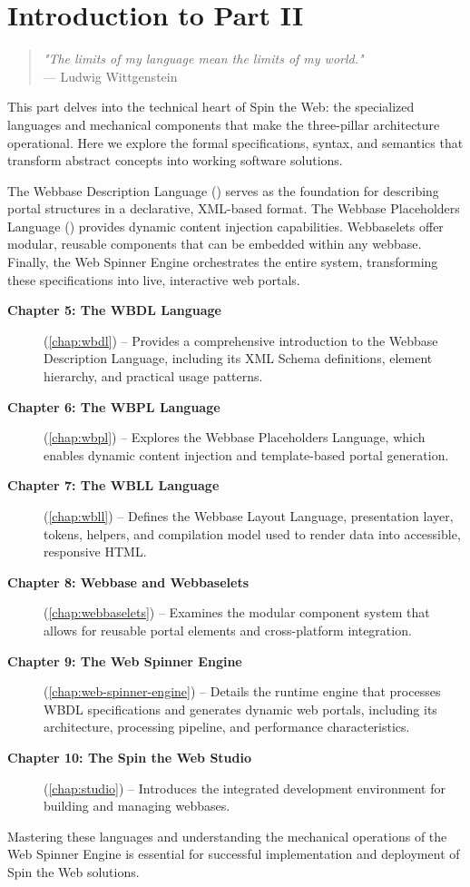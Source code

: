 
\chapter*{Introduction to Part II}
\label{part:languages}

\begin{quote}
\textit{"The limits of my language mean the limits of my world."} \\
— Ludwig Wittgenstein
\end{quote}

This part delves into the technical heart of Spin the Web: the specialized languages and mechanical components that make the three-pillar architecture operational. Here we explore the formal specifications, syntax, and semantics that transform abstract concepts into working software solutions.

The Webbase Description Language (\wbdl{}) serves as the foundation for describing portal structures in a declarative, XML-based format. The Webbase Placeholders Language (\wbpl{}) provides dynamic content injection capabilities. Webbaselets offer modular, reusable components that can be embedded within any webbase. Finally, the Web Spinner Engine orchestrates the entire system, transforming these specifications into live, interactive web portals.

\begin{description}
\item[\textbf{Chapter 5: The WBDL Language}] (\cref{chap:wbdl}) -- Provides a comprehensive introduction to the Webbase Description Language, including its XML Schema definitions, element hierarchy, and practical usage patterns.

\item[\textbf{Chapter 6: The WBPL Language}] (\cref{chap:wbpl}) -- Explores the Webbase Placeholders Language, which enables dynamic content injection and template-based portal generation.

\item[\textbf{Chapter 7: The WBLL Language}] (\cref{chap:wbll}) -- Defines the Webbase Layout Language, presentation layer, tokens, helpers, and compilation model used to render data into accessible, responsive HTML.

\item[\textbf{Chapter 8: Webbase and Webbaselets}] (\cref{chap:webbaselets}) -- Examines the modular component system that allows for reusable portal elements and cross-platform integration.

\item[\textbf{Chapter 9: The Web Spinner Engine}] (\cref{chap:web-spinner-engine}) -- Details the runtime engine that processes WBDL specifications and generates dynamic web portals, including its architecture, processing pipeline, and performance characteristics.

\item[\textbf{Chapter 10: The Spin the Web Studio}] (\cref{chap:studio}) -- Introduces the integrated development environment for building and managing webbases.

\end{description}

Mastering these languages and understanding the mechanical operations of the Web Spinner Engine is essential for successful implementation and deployment of Spin the Web solutions.
